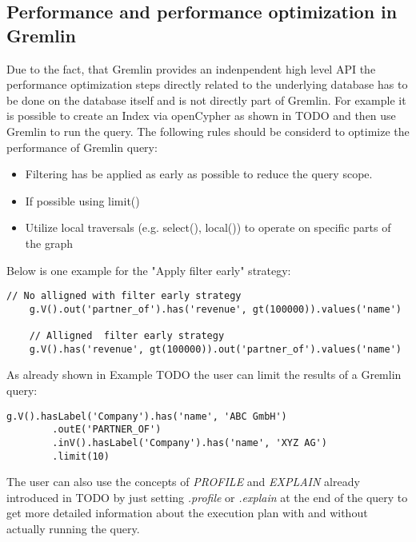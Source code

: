 \subsection{Performance and performance optimization in Gremlin}
Due to the fact, that Gremlin provides an indenpendent high level API 
the performance optimization steps directly related to the underlying database
has to be done on the database itself and is not directly part of Gremlin.
For example it is possible to create an Index via openCypher as shown in TODO and then use
Gremlin to run the query.
The following rules should be considerd to optimize the performance of Gremlin query:
\begin{itemize}
	\item Filtering has be applied as early as possible to reduce the query scope.
	\item If possible using limit()
	\item Utilize local traversals (e.g. select(), local()) to operate on specific parts of the graph
\end{itemize}
Below is one example for the "Apply filter early" strategy:
\begin{lstlisting}[caption={Apply filter early strategy in Gremlin}, label={lst:filterEarlyGremlin}]
	// No alligned with filter early strategy
	g.V().out('partner_of').has('revenue', gt(100000)).values('name')

	// Alligned  filter early strategy
	g.V().has('revenue', gt(100000)).out('partner_of').values('name')

\end{lstlisting}
As already shown in Example TODO the user can limit the results of a Gremlin query:
\begin{lstlisting}[caption={Set Limits in Gremlin}, label={lst:limitGremlin}]
	g.V().hasLabel('Company').has('name', 'ABC GmbH')
		.outE('PARTNER_OF')
		.inV().hasLabel('Company').has('name', 'XYZ AG')
		.limit(10)
\end{lstlisting}
The user can also use the concepts of \textit{PROFILE} and \textit{EXPLAIN} already introduced in 
TODO by just setting
\textit{.profile} or \textit{.explain} at the end of the query to get more detailed 
information about the execution plan with and without actually running the query.

